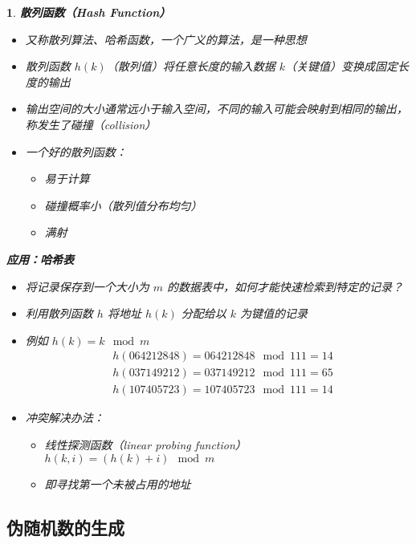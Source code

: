 \documentclass[UTF8]{report}
\theoremstyle{MyLineTheoremStyle} %
\theoremstyle{MyBlockTheoremStyle} %
\theoremstyle{MySubsubsectionStyle} %
\newtheorem{definition}{}
\begin{document}
\begin{definition}
    \textbf{散列函数（Hash Function）}
    \begin{itemize}
        \item 又称散列算法、哈希函数，一个广义的算法，是一种思想
        \item 散列函数 $h(k)$（散列值）将任意长度的输入数据 $k$（关键值）变换成固定长度的输出
        \item 输出空间的大小通常远小于输入空间，不同的输入可能会映射到相同的输出，称发生了碰撞（collision）
        \item 一个好的散列函数：
        \begin{itemize}
            \item 易于计算
            \item 碰撞概率小（散列值分布均匀）
            \item 满射
        \end{itemize}
    \end{itemize}

    \textbf{应用：哈希表}
    \begin{itemize}
        \item 将记录保存到一个大小为 $m$ 的数据表中，如何才能快速检索到特定的记录？
        \item 利用散列函数 $h$ 将地址 $h(k)$ 分配给以 $k$ 为键值的记录
        \item 例如 $h(k) = k \mod m$
        \[
        \begin{aligned}
            &h(064212848) = 064212848 \mod 111 = 14 \\
            &h(037149212) = 037149212 \mod 111 = 65 \\
            &h(107405723) = 107405723 \mod 111 = 14
        \end{aligned}
        \]
        \item 冲突解决办法：
        \begin{itemize}
            \item 线性探测函数（linear probing function） $h(k, i) = (h(k) + i) \mod m$
            \item 即寻找第一个未被占用的地址
        \end{itemize}
    \end{itemize}
\end{definition}

\subsection{伪随机数的生成}
\end{document}
